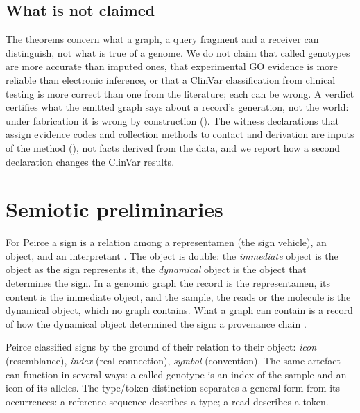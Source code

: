 \documentclass[11pt,twocolumn,a4paper]{article}
\theoremstyle{plain}
\theoremstyle{definition}
\theoremstyle{remark}
\begin{document}
\subsection{What is not claimed}

The theorems concern what a graph, a query fragment and a receiver can
distinguish, not what is true of a genome. We do not claim that called
genotypes are more accurate than imputed ones, that experimental GO evidence is
more reliable than electronic inference, or that a ClinVar classification from
clinical testing is more correct than one from the literature; each can be
wrong. A verdict certifies what the emitted graph says about a record's
generation, not the world: under fabrication it is wrong by construction
(). The witness declarations that assign evidence codes
and collection methods to contact and derivation are inputs of the method
(), not facts derived from the data, and we report how a
second declaration changes the ClinVar results.

\section{Semiotic preliminaries}
\label{sec:semiotics}

For Peirce a sign is a relation among a representamen (the sign vehicle), an
object, and an interpretant \citep{peirce_cp}. The object is double: the
\emph{immediate} object is the object as the sign represents it, the
\emph{dynamical} object is the object that determines the sign. In a genomic
graph the record is the representamen, its content is the immediate object,
and the sample, the reads or the molecule is the dynamical object, which no
graph contains. What a graph can contain is a record of how the dynamical
object determined the sign: a provenance chain \citep{provo}.

Peirce classified signs by the ground of their relation to their object:
\emph{icon} (resemblance), \emph{index} (real connection), \emph{symbol}
(convention). The same artefact can function in several ways: a called
genotype is an index of the sample and an icon of its alleles. The type/token
distinction \citep{peirce1906} separates a general form from its occurrences:
a reference sequence describes a type; a read describes a token.
\end{document}

